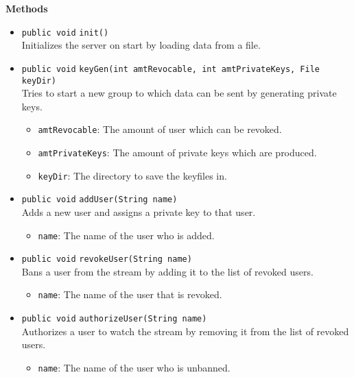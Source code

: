 \textbf{Methods}
\begin{itemize}
\item \lstinline|public void| \lstinline|init|\lstinline|()|\\
Initializes the server on start by loading data from a file.



\item \lstinline|public void| \lstinline|keyGen|\lstinline|(int amtRevocable, int amtPrivateKeys, File keyDir)|\\
Tries to start a new group to which data can be sent by generating private keys.
\begin{itemize}
\item \lstinline|amtRevocable|: The amount of user which can be revoked.
\item \lstinline|amtPrivateKeys|: The amount of private keys which are produced.
\item \lstinline|keyDir|: The directory to save the keyfiles in.
\end{itemize}



\item \lstinline|public void| \lstinline|addUser|\lstinline|(String name)|\\
Adds a new user and assigns a private key to that user.
\begin{itemize}
\item \lstinline|name|: The name of the user who is added.
\end{itemize}



\item \lstinline|public void| \lstinline|revokeUser|\lstinline|(String name)|\\
Bans a user from the stream by adding it to the list of revoked users.
\begin{itemize}
\item \lstinline|name|: The name of the user that is revoked.
\end{itemize}



\item \lstinline|public void| \lstinline|authorizeUser|\lstinline|(String name)|\\
Authorizes a user to watch the stream by removing it from the list of revoked users.
\begin{itemize}
\item \lstinline|name|: The name of the user who is unbanned.
\end{itemize}




\end{itemize}
